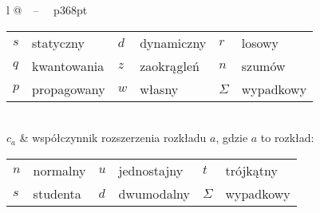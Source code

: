 \begin{longtable}[l]{ l @{~~--~~} p{368pt} }
\begin{tabular}{ *{3}{l @{~--~} l} }
                                  $s$ & statyczny   & $d$      & dynamiczny & $r$      & losowy     \\
                                  $q$ & kwantowania & $z$      & zaokrągleń & $n$      & szumów     \\
                                  $p$ & propagowany & $w$      & własny     & $\Sigma$ & wypadkowy
                                  \end{tabular} \\
$c_{a}$                         & współczynnik rozszerzenia rozkładu $a$, gdzie $a$ to rozkład: \newline
                                  \begin{tabular}{ *{3}{l @{~--~} l} }
                                  $n$ & normalny    & $u$      & jednostajny & $t$      & trójkątny  \\
                                  $s$ & studenta    & $d$      & dwumodalny  & $\Sigma$ & wypadkowy
                                  \end{tabular} \\
\end{longtable}
